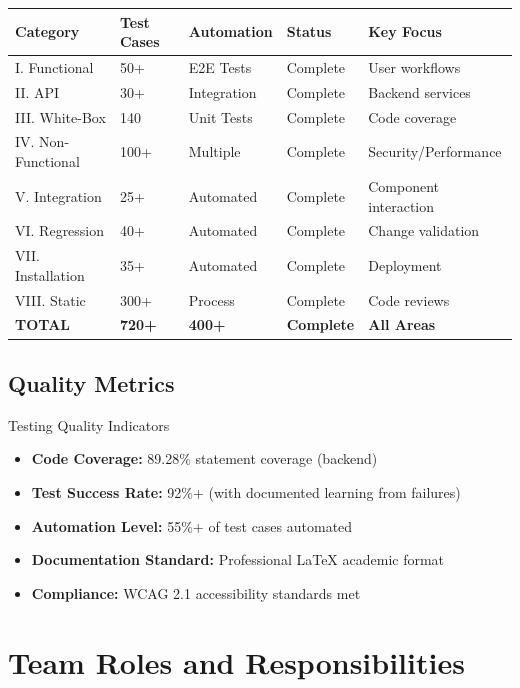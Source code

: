 \documentclass[12pt,a4paper]{article}
\begin{document}
\begin{longtable}{|p{3cm}|p{2cm}|p{2cm}|p{2cm}|p{4cm}|}
\hline
\textbf{Category} & \textbf{Test Cases} & \textbf{Automation} & \textbf{Status} & \textbf{Key Focus} \\
\hline
\endhead
I. Functional & 50+ & E2E Tests & Complete & User workflows \\
\hline
II. API & 30+ & Integration & Complete & Backend services \\
\hline
III. White-Box & 140 & Unit Tests & Complete & Code coverage \\
\hline
IV. Non-Functional & 100+ & Multiple & Complete & Security/Performance \\
\hline
V. Integration & 25+ & Automated & Complete & Component interaction \\
\hline
VI. Regression & 40+ & Automated & Complete & Change validation \\
\hline
VII. Installation & 35+ & Automated & Complete & Deployment \\
\hline
VIII. Static & 300+ & Process & Complete & Code reviews \\
\hline
\textbf{TOTAL} & \textbf{720+} & \textbf{400+} & \textbf{Complete} & \textbf{All Areas} \\
\hline
\end{longtable}

\subsection{Quality Metrics}

\begin{infobox}{Testing Quality Indicators}
\begin{itemize}[leftmargin=*]
    \item \textbf{Code Coverage:} 89.28\% statement coverage (backend)
    \item \textbf{Test Success Rate:} 92\%+ (with documented learning from failures)
    \item \textbf{Automation Level:} 55\%+ of test cases automated
    \item \textbf{Documentation Standard:} Professional LaTeX academic format
    \item \textbf{Compliance:} WCAG 2.1 accessibility standards met
\end{itemize}
\end{infobox}

\section{Team Roles and Responsibilities}
\end{document}
